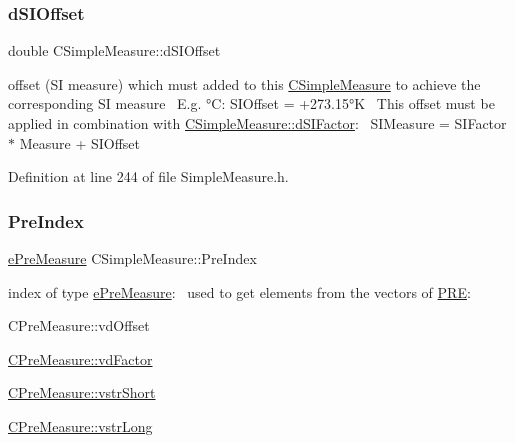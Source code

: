 \subsubsection{\texorpdfstring{d\+S\+I\+Offset}{dSIOffset}}
{\footnotesize\ttfamily double C\+Simple\+Measure\+::d\+S\+I\+Offset\hspace{0.3cm}{\ttfamily [protected]}}



offset (SI measure) which must added to this \hyperlink{classCSimpleMeasure}{C\+Simple\+Measure} to achieve the corresponding SI measure~\newline
 E.\+g. °C\+: S\+I\+Offset = +273.15°K~\newline
 This offset must be applied in combination with \hyperlink{classCSimpleMeasure_a08be520f9d3a0e50cc63693f2fc607f2}{C\+Simple\+Measure\+::d\+S\+I\+Factor}\+:~\newline
 S\+I\+Measure = S\+I\+Factor $\ast$ Measure + S\+I\+Offset 



Definition at line 244 of file Simple\+Measure.\+h.

\mbox{\label{classCSimpleMeasure_aa23ed9eec21adb9a97c90a424e7ee18a}} 
\subsubsection{\texorpdfstring{Pre\+Index}{PreIndex}}
{\footnotesize\ttfamily \hyperlink{PreMeasure_8h_a6c81167b8d4c2badde42f81cb7214620}{e\+Pre\+Measure} C\+Simple\+Measure\+::\+Pre\+Index\hspace{0.3cm}{\ttfamily [protected]}}



index of type \hyperlink{PreMeasure_8h_a6c81167b8d4c2badde42f81cb7214620}{e\+Pre\+Measure}\+:~\newline
 used to get elements from the vectors of \hyperlink{PreMeasure_8h_a349316092037fdd0773335fab4e15ee8}{P\+RE}\+: 


\begin{DoxyItemize}
\item C\+Pre\+Measure\+::vd\+Offset
\item \hyperlink{classCVectorHandle_af8f8b2e0da8363e695872ca85f33364e}{C\+Pre\+Measure\+::vd\+Factor}
\item \hyperlink{classCVectorHandle_afb50c8a33d4cf70bf92c644dca409ea2}{C\+Pre\+Measure\+::vstr\+Short}
\item \hyperlink{classCVectorHandle_a71bec0e385b9ca8e5ffa174b559da9f8}{C\+Pre\+Measure\+::vstr\+Long} 
\end{DoxyItemize}

